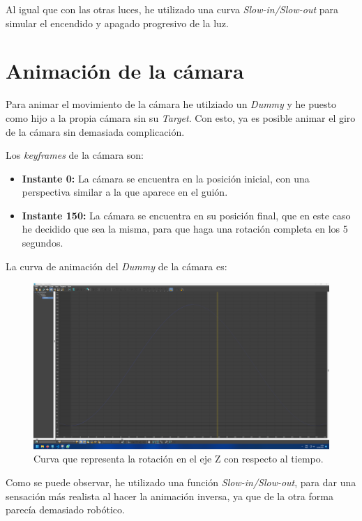 \documentclass{article}
\begin{document}
Al igual que con las otras luces, he utilizado una curva \textit{Slow-in/Slow-out} para simular el encendido y apagado progresivo de la luz.

\section{Animación de la cámara}
Para animar el movimiento de la cámara he utilziado un \textit{Dummy} y he puesto como hijo a la propia cámara sin su \textit{Target}. Con esto, ya es posible animar el giro de la cámara sin demasiada complicación.

Los \textit{keyframes} de la cámara son:

\begin{itemize}
    \item \textbf{Instante 0: }La cámara se encuentra en la posición inicial, con una perspectiva similar a la que aparece en el guión.
    \item \textbf{Instante 150: }La cámara se encuentra en su posición final, que en este caso he decidido que sea la misma, para que haga una rotación completa en los 5 segundos.
\end{itemize}

La curva de animación del \textit{Dummy} de la cámara es:

\begin{figure}[H]
    \centering
    \includegraphics[width=\textwidth]{imagenes/curvas/Camara/blue.png}
    \caption{Curva que representa la rotación en el eje Z con respecto al tiempo.}
 \end{figure}

Como se puede observar, he utilizado una función \textit{Slow-in/Slow-out}, para dar una sensación más realista al hacer la animación inversa, ya que de la otra forma parecía demasiado robótico.
\end{document}
